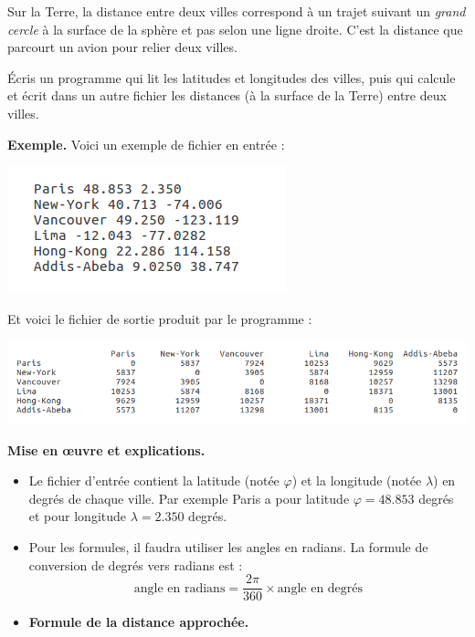 \documentclass[11pt,class=report,crop=false]{standalone}
\begin{document}
\begin{activite}
\begin{enumerate}
Sur la Terre, la distance entre deux villes correspond à un trajet suivant un \emph{grand cercle} à la surface de la sphère et pas selon une ligne droite. C'est la distance que parcourt un avion pour relier deux villes.

 Écris un programme qui lit les latitudes et longitudes des villes, puis qui calcule et écrit dans un autre fichier les distances (à la surface de la Terre) entre deux villes. 
  
\textbf{Exemple.} Voici un exemple de fichier en entrée :
\begin{center}
\includegraphics[scale=\myscale,scale=0.7]{ecran-fichiers-4c}
\end{center}   

Et voici le fichier de sortie produit par le programme :
\begin{center}
\includegraphics[scale=\myscale,scale=0.55]{ecran-fichiers-4d} 
\end{center}  
    
    
\textbf{Mise en \oe uvre et explications.}

\begin{itemize}
	\item Le fichier d'entrée contient la latitude (notée $\varphi$) et la longitude (notée $\lambda$) en degrés de chaque ville. Par exemple Paris a pour latitude $\varphi = 48.853$ degrés et pour longitude $\lambda = 2.350$ degrés.
	
	\item Pour les formules, il faudra utiliser les angles en radians. La formule de conversion de degrés vers radians est :
	$$\text{angle en radians} = \frac{2\pi}{360} \times \text{angle en degrés}$$
		
	\item \textbf{Formule de la distance approchée.}
	

\end{itemize}
\end{enumerate}
\end{activite}
\end{document}
